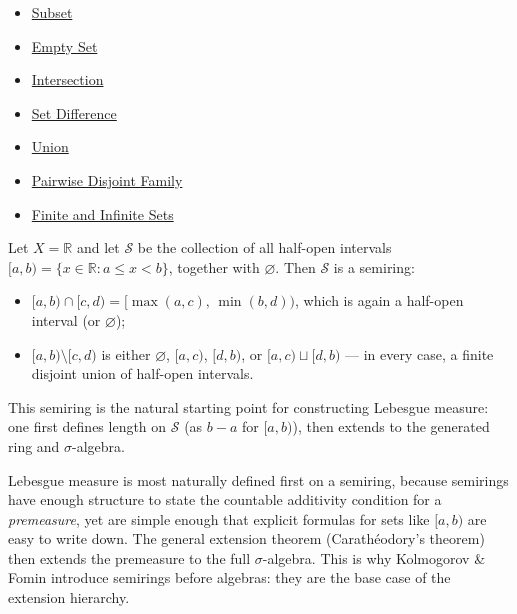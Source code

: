 \begin{dependencies}
\begin{itemize}
  \item \hyperref[def:subset]{Subset}
  \item \hyperref[def:empty-set]{Empty Set}
  \item \hyperref[def:intersection]{Intersection}
  \item \hyperref[def:set-difference]{Set Difference}
  \item \hyperref[def:union]{Union}
  \item \hyperref[def:pairwise-disjoint]{Pairwise Disjoint Family}
  \item \hyperref[def:finite-infinite]{Finite and Infinite Sets}
\end{itemize}
\end{dependencies}

\begin{example*}
\label{ex:semiring-intervals}
Let $X = \mathbb{R}$ and let $\mathcal{S}$ be the collection of all half-open
intervals $[a, b) = \{x \in \mathbb{R} : a \leq x < b\}$, together with
$\varnothing$. Then $\mathcal{S}$ is a semiring:
\begin{itemize}
\item $[a,b) \cap [c,d) = [\max(a,c),\, \min(b,d))$, which is again a half-open
  interval (or $\varnothing$);
\item $[a,b) \setminus [c,d)$ is either $\varnothing$, $[a,c)$, $[d,b)$, or
  $[a,c) \sqcup [d,b)$ --- in every case, a finite disjoint union of half-open
  intervals.
\end{itemize}
This semiring is the natural starting point for constructing Lebesgue measure:
one first defines length on $\mathcal{S}$ (as $b - a$ for $[a,b)$), then
extends to the generated ring and $\sigma$-algebra.
\end{example*}

\begin{remark*}
Lebesgue measure is most naturally defined first on a semiring, because
semirings have enough structure to state the countable additivity condition for
a \emph{premeasure}, yet are simple enough that explicit formulas for sets like
$[a,b)$ are easy to write down. The general extension theorem (Carath\'{e}odory's
theorem) then extends the premeasure to the full $\sigma$-algebra. This is why
Kolmogorov \& Fomin introduce semirings before algebras: they are the base
case of the extension hierarchy.
\end{remark*}

